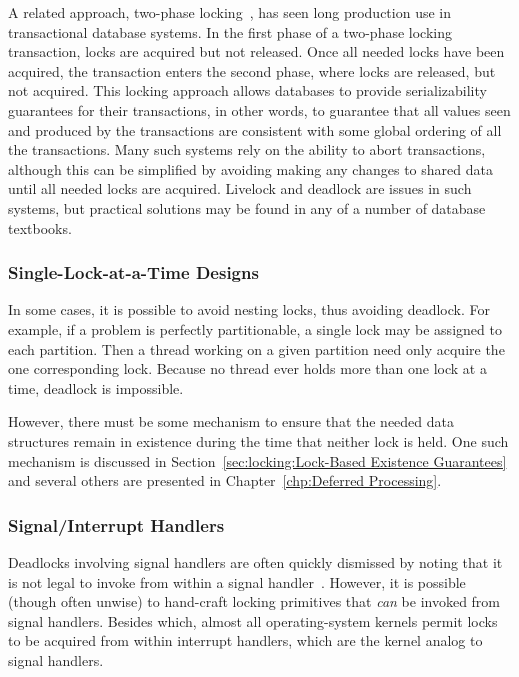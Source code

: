 A related approach, two-phase locking~\cite{PhilipABernstein1987},
has seen long production use in transactional database systems.
In the first phase of a two-phase locking transaction, locks are
acquired but not released.
Once all needed locks have been acquired, the transaction enters the
second phase, where locks are released, but not acquired.
This locking approach allows databases to provide serializability
guarantees for their transactions, in other words, to guarantee
that all values seen and produced by the transactions are consistent
with some global ordering of all the transactions.
Many such systems rely on the ability to abort transactions, although
this can be simplified by avoiding making any changes to shared data
until all needed locks are acquired.
Livelock and deadlock are issues in such systems, but practical
solutions may be found in any of a number of database textbooks.

\subsubsection{Single-Lock-at-a-Time Designs}
\label{sec:locking:Single-Lock-at-a-Time Designs}

In some cases, it is possible to avoid nesting locks, thus avoiding
deadlock.
For example, if a problem is perfectly partitionable, a single
lock may be assigned to each partition.
Then a thread working on a given partition need only acquire the one
corresponding lock.
Because no thread ever holds more than one lock at a time,
deadlock is impossible.

However, there must be some mechanism to ensure that the needed data
structures remain in existence during the time that neither lock is
held.
One such mechanism is discussed in
Section~\ref{sec:locking:Lock-Based Existence Guarantees}
and several others are presented in
Chapter~\ref{chp:Deferred Processing}.

\subsubsection{Signal/Interrupt Handlers}
\label{sec:locking:Signal/Interrupt Handlers}

Deadlocks involving signal handlers are often quickly dismissed by
noting that it is not legal to invoke  from
within a signal handler~\cite{OpenGroup1997pthreads}.
However, it is possible (though often unwise) to hand-craft
locking primitives that \emph{can} be invoked from signal handlers.
Besides which, almost all operating-system kernels permit locks to
be acquired from within interrupt handlers, which are the kernel analog
to signal handlers.

